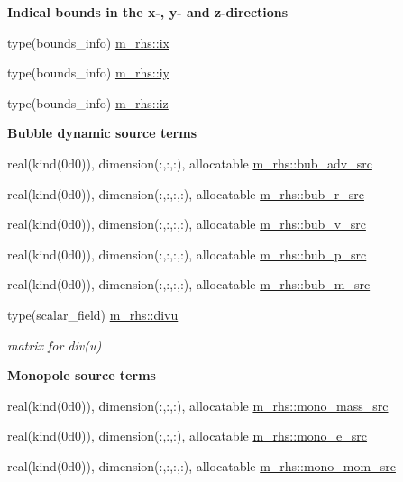 \begin{Indent}\textbf{ Indical bounds in the x-\/, y-\/ and z-\/directions}\par
\begin{DoxyCompactItemize}
\item 
type(bounds\+\_\+info) \hyperlink{namespacem__rhs_a25b43c26b2e6ed431b9ec51d6af30c74}{m\+\_\+rhs\+::ix}
\item 
type(bounds\+\_\+info) \hyperlink{namespacem__rhs_a3d9a864b60496c110f161a93eebc86c6}{m\+\_\+rhs\+::iy}
\item 
type(bounds\+\_\+info) \hyperlink{namespacem__rhs_a83ac0b7807345a6879af324bae08c419}{m\+\_\+rhs\+::iz}
\end{DoxyCompactItemize}
\end{Indent}
\begin{Indent}\textbf{ Bubble dynamic source terms}\par
\begin{DoxyCompactItemize}
\item 
real(kind(0d0)), dimension(\+:,\+:,\+:), allocatable \hyperlink{namespacem__rhs_a09ebe4906d3bb2a6656da08fea5a4e49}{m\+\_\+rhs\+::bub\+\_\+adv\+\_\+src}
\item 
real(kind(0d0)), dimension(\+:,\+:,\+:,\+:), allocatable \hyperlink{namespacem__rhs_ab1f280657ebd60c51baf22e79dffaeb2}{m\+\_\+rhs\+::bub\+\_\+r\+\_\+src}
\item 
real(kind(0d0)), dimension(\+:,\+:,\+:,\+:), allocatable \hyperlink{namespacem__rhs_a35e063bb3f8fd0f8210a6305d01cae96}{m\+\_\+rhs\+::bub\+\_\+v\+\_\+src}
\item 
real(kind(0d0)), dimension(\+:,\+:,\+:,\+:), allocatable \hyperlink{namespacem__rhs_ab0521faf3afa606d8ebfd272176f3301}{m\+\_\+rhs\+::bub\+\_\+p\+\_\+src}
\item 
real(kind(0d0)), dimension(\+:,\+:,\+:,\+:), allocatable \hyperlink{namespacem__rhs_a45d112ac19bd1a893d86a1a49fd6d6b6}{m\+\_\+rhs\+::bub\+\_\+m\+\_\+src}
\item 
type(scalar\+\_\+field) \hyperlink{namespacem__rhs_abf83c819d81616e9342f773a4067938c}{m\+\_\+rhs\+::divu}
\begin{DoxyCompactList}\small\item\em matrix for div(u) \end{DoxyCompactList}\end{DoxyCompactItemize}
\end{Indent}
\begin{Indent}\textbf{ Monopole source terms}\par
\begin{DoxyCompactItemize}
\item 
real(kind(0d0)), dimension(\+:,\+:,\+:), allocatable \hyperlink{namespacem__rhs_acfcb0aeeb4659d44b0dd6fbf0b82ee79}{m\+\_\+rhs\+::mono\+\_\+mass\+\_\+src}
\item 
real(kind(0d0)), dimension(\+:,\+:,\+:), allocatable \hyperlink{namespacem__rhs_a307adefdd895260e42e85872aa306929}{m\+\_\+rhs\+::mono\+\_\+e\+\_\+src}
\item 
real(kind(0d0)), dimension(\+:,\+:,\+:,\+:), allocatable \hyperlink{namespacem__rhs_ad2c988fa9d53b74f824dfd0666df27c0}{m\+\_\+rhs\+::mono\+\_\+mom\+\_\+src}
\end{DoxyCompactItemize}
\end{Indent}
